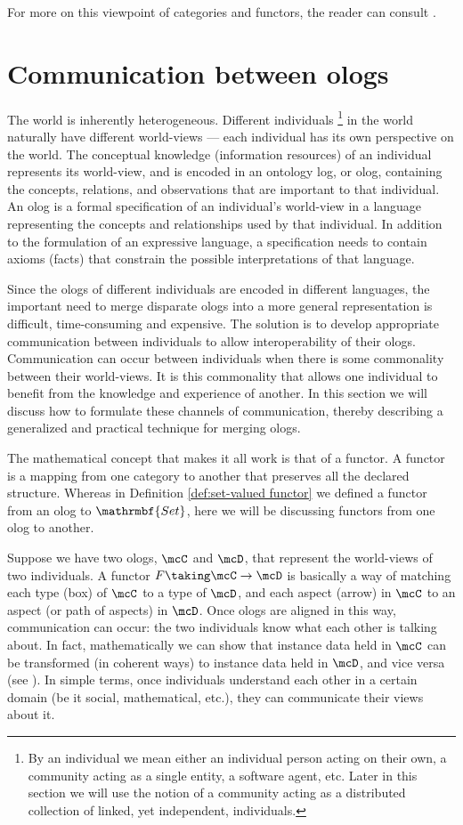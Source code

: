 For more on this viewpoint of categories and functors, the reader can consult \cite{Spi-Cats}.

\section{Communication between ologs}\label{sec:connecting ologs}

The world is inherently heterogeneous. 
Different individuals 
%
\footnote{By an individual we mean 
either an individual person acting on their own, a community acting as a single entity, a software agent, etc.
Later in this section
we will use the notion of a community acting as a distributed collection of linked, yet independent, individuals.}
%
in the world naturally have different world-views 
--- each individual has its own perspective on the world. 
The conceptual knowledge (information resources) of an individual represents its world-view, 
and is encoded in an ontology log, or olog, containing the concepts, relations, and observations 
that are important to that individual.
An olog is a formal specification of 
an individual's world-view in a language representing the concepts and relationships used by that individual. 
In addition to the formulation of an expressive language,
a specification needs to contain axioms (facts) that constrain the possible interpretations of that language. 

Since the ologs of different individuals are encoded in different languages, 
the important need to merge disparate ologs into a more general representation 
is difficult, time-consuming and expensive. 
The solution is to develop appropriate communication between individuals to allow interoperability of their ologs.
Communication can occur between individuals when there is some commonality between their world-views. 
It is this commonality that allows one individual to benefit from the knowledge and experience of another. 
In this section we will discuss how to formulate these channels of communication, 
thereby describing a generalized and practical technique for merging ologs.

The mathematical concept that makes it all work is that of a functor. 
A functor is a mapping from one category to another that preserves all the declared structure.
Whereas in Definition \ref{def:set-valued functor} 
we defined a functor from an olog to $\mathrmbf{Set}$, 
here we will be discussing functors from one olog to another. 

Suppose we have two ologs, $\mcC$ and $\mcD$, that represent the world-views of two individuals. 
A functor $F\taking\mcC\to\mcD$ is basically a way of matching each type (box) of $\mcC$ to a type of $\mcD$, 
and each aspect (arrow) in $\mcC$ to an aspect (or path of aspects) in $\mcD$. 
Once ologs are aligned in this way, communication can occur: 
the two individuals know what each other is talking about. 
In fact, 
mathematically we can show that 
instance data held in $\mcC$ can be transformed (in coherent ways) to instance data held in $\mcD$, 
and vice versa (see \cite{Spi-FDM}).
In simple terms, 
once individuals understand each other in a certain domain (be it social, mathematical, etc.), 
they can communicate their views about it.

